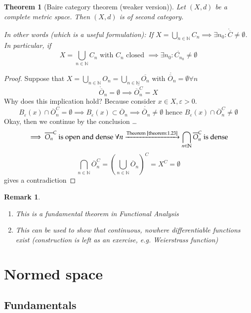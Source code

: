 \documentclass[a4paper]{article}
\newcounter{lecref}[section]
\numberwithin{lecref}{section}
\newtheorem{theorem}[lecref]{Theorem}
\newtheorem*{Remark}{Remark}
\begin{document}
\begin{theorem}[Baire category theorem (weaker version)]
	Let $(X, d)$ be a complete metric space. Then $(X, d)$ is of second category.

	In other words (which is a useful formulation):
	If $X = \bigcup_{n \in \mathbb N} C_n \implies \exists n_0: \mathring{\overline C} \neq \emptyset$.
	In particular, if
	\[ X = \bigcup_{n \in \mathbb N} C_n \text{ with } C_n \text{ closed } \implies \exists n_0: \mathring{C_{n_0}} \neq \emptyset \]
\end{theorem}

\begin{proof}
	Suppose that $X = \bigcup_{n \in \mathbb N} O_n = \bigcup_{n \in \mathbb N} \overline{O_n}$ with $\mathring{\overline O_n} = \emptyset \forall n$
	\[ \mathring{\overline O}_n = \emptyset \implies \overline{\overline{O}_n^C} = X \]
	Why does this implication hold? Because consider $x \in X, \varepsilon > 0$.
	\[ B_\varepsilon(x) \cap \overline O_n^C = \emptyset \implies B_{\varepsilon}(x) \subset \overline{O}_n \implies \mathring{\overline O_n} \neq \emptyset \text{ hence } B_\varepsilon(x) \cap {\overline O}_n^C \neq \emptyset \]
	Okay, then we continue by the conclusion \dots
	\[ \implies \overline{O_n}^C \text{ is open and dense } \forall n \xrightarrow{\text{Theorem~\ref{theorem:1.23}}} \bigcap_{n \in \mathbb N} \overline{O}_n^C \text{ is dense} \]
	\[ \bigcap_{n \in \mathbb N} \overline{O}_n^C = \left(\bigcup_{n \in \mathbb N} \overline{O}_n\right)^C = X^C = \emptyset \]
	gives a contradiction
\end{proof}

\begin{Remark}
	\begin{enumerate}
		\item This is a fundamental theorem in Functional Analysis
		\item This can be used to show that continuous, nowhere differentiable functions exist (construction is left as an exercise, e.g. Weierstrass function)
	\end{enumerate}
\end{Remark}

\section{Normed space}
\label{section:2}
\subsection{Fundamentals}
\label{section:2.1}
\end{document}
